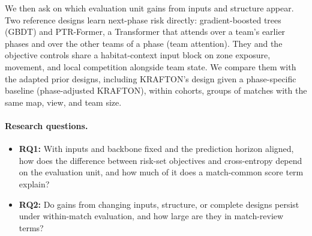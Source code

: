 \documentclass[sigconf,anonymous,nonacm]{acmart}
\begin{document}
We then ask on which evaluation unit gains from inputs and structure appear. Two reference designs learn next-phase risk directly: gradient-boosted trees (GBDT) and PTR-Former, a Transformer that attends over a team's earlier phases and over the other teams of a phase (team attention). They and the objective controls share a habitat-context input block on zone exposure, movement, and local competition alongside team state. We compare them with the adapted prior designs, including KRAFTON's design given a phase-specific baseline (phase-adjusted KRAFTON), within cohorts, groups of matches with the same map, view, and team size.

\paragraph{Research questions.}
\begin{itemize}
\item \textbf{RQ1:} With inputs and backbone fixed and the prediction horizon aligned, how does the difference between risk-set objectives and cross-entropy depend on the evaluation unit, and how much of it does a match-common score term explain?
\item \textbf{RQ2:} Do gains from changing inputs, structure, or complete designs persist under within-match evaluation, and how large are they in match-review terms?
\end{itemize}
\end{document}
